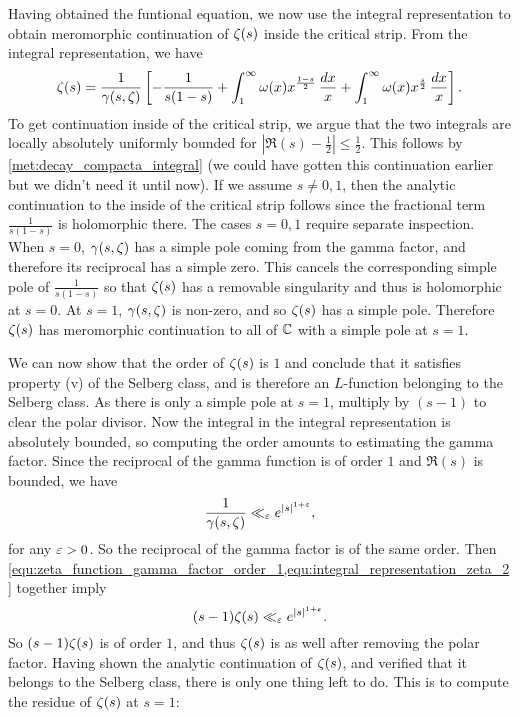       Having obtained the funtional equation, we now use the integral representation to obtain meromorphic continuation of $\zeta(s)$ inside the critical strip. From the integral representation, we have
      \begin{equation}\label{equ:integral_representation_zeta_2}
        \zeta(s) = \frac{1}{\gamma(s,\zeta)}\left[-\frac{1}{s(1-s)}+\int_{1}^{\infty}\omega(x)x^{\frac{1-s}{2}}\,\frac{dx}{x}+\int_{1}^{\infty}\omega(x)x^{\frac{s}{2}}\,\frac{dx}{x}\right].
      \end{equation}
      To get continuation inside of the critical strip, we argue that the two integrals are locally absolutely uniformly bounded for $|\Re(s)-\frac{1}{2}| \le \frac{1}{2}$. This follows by \cref{met:decay_compacta_integral} (we could have gotten this continuation earlier but we didn't need it until now). If we assume $s \neq 0,1$, then the analytic continuation to the inside of the critical strip follows since the fractional term $\frac{1}{s(1-s)}$ is holomorphic there. The cases $s = 0,1$ require separate inspection. When $s = 0$, $\gamma(s,\zeta)$ has a simple pole coming from the gamma factor, and therefore its reciprocal has a simple zero. This cancels the corresponding simple pole of $\frac{1}{s(1-s)}$ so that $\zeta(s)$ has a removable singularity and thus is holomorphic at $s = 0$. At $s = 1$, $\gamma(s,\zeta)$ is non-zero, and so $\zeta(s)$ has a simple pole. Therefore $\zeta(s)$ has meromorphic continuation to all of $\mathbb{C}$ with a simple pole at $s = 1$.

      We can now show that the order of $\zeta(s)$ is $1$ and conclude that it satisfies property (v) of the Selberg class, and is therefore an $L$-function belonging to the Selberg class. As there is only a simple pole at $s = 1$, multiply by $(s-1)$ to clear the polar divisor. Now the integral in the integral representation is absolutely bounded, so computing the order amounts to estimating the gamma factor. Since the reciprocal of the gamma function is of order $1$ and $\Re(s)$ is bounded, we have
      \begin{equation}\label{equ:zeta_function_gamma_factor_order_1}
        \frac{1}{\gamma(s,\zeta)} \ll_{\varepsilon} e^{|s|^{1+\varepsilon}},
      \end{equation}
      for any $\varepsilon > 0$. So the reciprocal of the gamma factor is of the same order. Then \cref{equ:zeta_function_gamma_factor_order_1,equ:integral_representation_zeta_2} together imply
      \[
        (s-1)\zeta(s) \ll_{\varepsilon} e^{|s|^{1+\varepsilon}}.
      \]
      So $(s-1)\zeta(s)$ is of order $1$, and thus $\zeta(s)$ is as well after removing the polar factor. Having shown the analytic continuation of $\zeta(s)$, and verified that it belongs to the Selberg class, there is only one thing left to do. This is to compute the residue of $\zeta(s)$ at $s = 1$:

